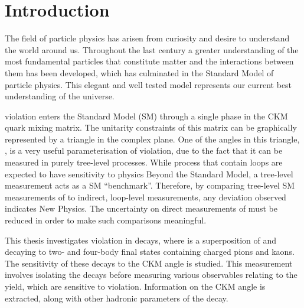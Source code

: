 %


\chapter{\label{ch:1-intro}Introduction} 

The field of particle physics has arisen from curiosity and desire to understand the world around us. Throughout the last century a greater understanding of the most fundamental particles that constitute matter and the interactions between them has been developed, which has culminated in the Standard Model of particle physics. This elegant and well tested model represents our current best understanding of the universe.

\CP violation enters the Standard Model (SM) through a single phase in the CKM quark mixing matrix. The unitarity constraints of this matrix can be graphically represented by a triangle in the complex plane. One of the angles in this triangle, \Pgamma, is a very useful parameterisation of \CP violation, due to the fact that it can be measured in purely tree-level processes. While process that contain loops are expected to have sensitivity to physics Beyond the Standard Model, a tree-level measurement acts as a SM ``benchmark''. Therefore, by comparing tree-level SM measurements of \Pgamma to indirect, loop-level measurements, any deviation observed indicates New Physics. The uncertainty on direct measurements of \Pgamma must be reduced in order to make such comparisons meaningful.

This thesis investigates \CP violation in \btodkst decays, where \D is a superposition of \Dz and \Dzb decaying to two- and four-body final states containing charged pions and kaons. The sensitivity of these decays to the CKM angle \Pgamma is studied. This measurement involves isolating the \btodkst decays before measuring various observables relating to the yield, which are sensitive to \CP violation. Information on the CKM angle \Pgamma is extracted, along with other hadronic parameters of the decay.

